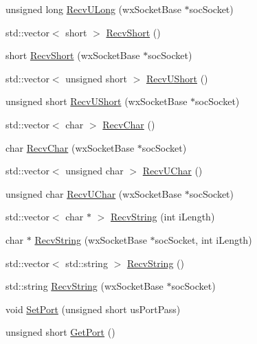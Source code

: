 \begin{DoxyCompactItemize}
\item 
unsigned long \hyperlink{classs13_w_x_w_server_a23b7224e84fe8c0b1bfd9b1acde61158}{Recv\+U\+Long} (wx\+Socket\+Base $\ast$soc\+Socket)
\item 
std\+::vector$<$ short $>$ \hyperlink{classs13_w_x_w_server_a59b63513c65b75d675e2720c9622ef79}{Recv\+Short} ()
\item 
short \hyperlink{classs13_w_x_w_server_a3473071c9dfa158f21b6b6e7c7665987}{Recv\+Short} (wx\+Socket\+Base $\ast$soc\+Socket)
\item 
std\+::vector$<$ unsigned short $>$ \hyperlink{classs13_w_x_w_server_ade2d9797a65eef7a1d7443c927a02e0a}{Recv\+U\+Short} ()
\item 
unsigned short \hyperlink{classs13_w_x_w_server_a2815eea13a957f20c386d16b89475bdd}{Recv\+U\+Short} (wx\+Socket\+Base $\ast$soc\+Socket)
\item 
std\+::vector$<$ char $>$ \hyperlink{classs13_w_x_w_server_af5da183bdfbec56944945bbb07c8edf4}{Recv\+Char} ()
\item 
char \hyperlink{classs13_w_x_w_server_a4bd0bc265f76dd9dcd900d945f85eca3}{Recv\+Char} (wx\+Socket\+Base $\ast$soc\+Socket)
\item 
std\+::vector$<$ unsigned char $>$ \hyperlink{classs13_w_x_w_server_a5285ad8ed819116499d71a842ad00487}{Recv\+U\+Char} ()
\item 
unsigned char \hyperlink{classs13_w_x_w_server_a3df41a4b3daae9482932053b61383f11}{Recv\+U\+Char} (wx\+Socket\+Base $\ast$soc\+Socket)
\item 
std\+::vector$<$ char $\ast$ $>$ \hyperlink{classs13_w_x_w_server_afa00b7b2e64e9b88bbcd31248bfe1288}{Recv\+String} (int i\+Length)
\item 
char $\ast$ \hyperlink{classs13_w_x_w_server_ab8de800803ab5c7727f759e26f1c18a6}{Recv\+String} (wx\+Socket\+Base $\ast$soc\+Socket, int i\+Length)
\item 
std\+::vector$<$ std\+::string $>$ \hyperlink{classs13_w_x_w_server_aee4e1f6b8291d9cce9ae07a6aaeb5775}{Recv\+String} ()
\item 
std\+::string \hyperlink{classs13_w_x_w_server_abe3612f3917a1180aa3bf8970aeafb92}{Recv\+String} (wx\+Socket\+Base $\ast$soc\+Socket)
\item 
void \hyperlink{classs13_w_x_w_server_af94fc4c2bdc1d90cd068c47becacb4e2}{Set\+Port} (unsigned short us\+Port\+Pass)
\item 
unsigned short \hyperlink{classs13_w_x_w_server_a3ab3cee9c57a0934dd8b2272825ef7a4}{Get\+Port} ()
\item 

\end{DoxyCompactItemize}
